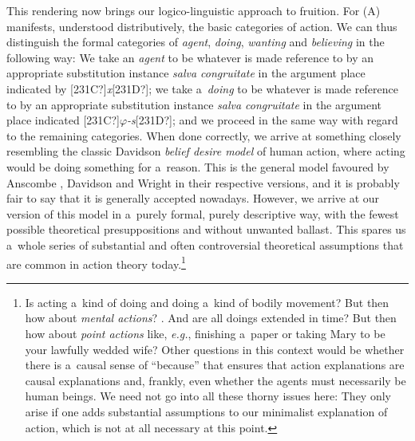 This rendering now brings our logico-linguistic approach to fruition. For (A) manifests, understood distributively, the basic categories of action. We can thus distinguish the formal categories of \textit{agent}, \textit{doing}, \textit{wanting} and \textit{believing} in the following way: We take an \textit{agent} to be whatever is made reference to by an appropriate substitution instance \textit{salva congruitate} in the argument place indicated by [231C?]\textit{x}[231D?]; we take a~\textit{doing} to be whatever is made reference to by an appropriate substitution instance \textit{salva congruitate} in the argument place indicated [231C?]\textit{$\varphi $-s}[231D?]; and we proceed in the same way with regard to the remaining categories. When done correctly, we arrive at something closely resembling the classic Davidson \textit{belief desire model} of human action, where acting would be doing something for a~reason. This is the general model favoured by Anscombe 
\parencite*[][]{anscombe_intention_1957}, %
 Davidson 
\parencite*[][]{} %
 and Wright 
\parencite*[][]{} %
 in their respective versions, and it is probably fair to say that it is generally accepted nowadays. However, we arrive at our version of this model in a~purely formal, purely descriptive way, with the fewest possible theoretical presuppositions and without unwanted ballast. This spares us a~whole series of substantial and often controversial theoretical assumptions that are common in action theory today.\footnote{Is acting a~kind of doing and doing a~kind of bodily movement? But then how about \textit{mental actions}? 
\parencite[cf., e.g.,][]{obrien_mental_2009}. %
 And are all doings extended in time? 
\parencite[][p.158]{frankfurt_problem_1978} %
 But then how about \textit{point actions} like, \textit{e.g.}, finishing a~paper or taking Mary to be your lawfully wedded wife? Other questions in this context would be whether there is a~causal sense of ``because'' that ensures that action explanations are causal explanations 
\parencite[cf.][]{} %
 and, frankly, even whether the agents must necessarily be human beings. We need not go into all these thorny issues here: They only arise if one adds substantial assumptions to our minimalist explanation of action, which is not at all necessary at this point. }



